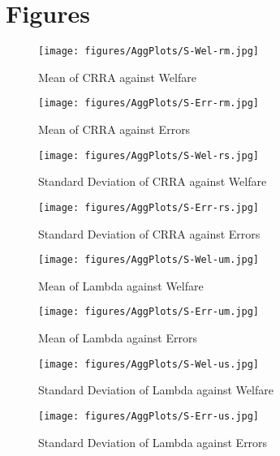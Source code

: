 \documentclass[../main.tex]{subfiles}
\begin{document}
\newpage

\section{Figures}

\begin{figure}[hp!]
	\center
	\caption{Mean of CRRA against Welfare}
	\texttt{[image: figures/AggPlots/S-Wel-rm.jpg]}
	\label{fig:S-Wel-rm}
\end{figure}

\begin{figure}[hp!]
	\center
	\caption{Mean of CRRA against Errors}
	\texttt{[image: figures/AggPlots/S-Err-rm.jpg]}
	\label{fig:S-Err-rm}
\end{figure}

\begin{figure}[hp!]
	\center
	\caption{Standard Deviation of CRRA against Welfare}
	\texttt{[image: figures/AggPlots/S-Wel-rs.jpg]}
	\label{fig:S-Wel-rs}
\end{figure}

\begin{figure}[hp!]
	\center
	\caption{Standard Deviation of CRRA against Errors}
	\texttt{[image: figures/AggPlots/S-Err-rs.jpg]}
	\label{fig:S-Err-rs}
\end{figure}

\begin{figure}[hp!]
	\center
	\caption{Mean of Lambda against Welfare}
	\texttt{[image: figures/AggPlots/S-Wel-um.jpg]}
	\label{fig:S-Wel-um}
\end{figure}

\begin{figure}[hp!]
	\center
	\caption{Mean of Lambda against Errors}
	\texttt{[image: figures/AggPlots/S-Err-um.jpg]}
	\label{fig:S-Err-um}
\end{figure}

\begin{figure}[hp!]
	\center
	\caption{Standard Deviation of Lambda against Welfare}
	\texttt{[image: figures/AggPlots/S-Wel-us.jpg]}
	\label{fig:S-Wel-us}
\end{figure}

\begin{figure}[hp!]
	\center
	\caption{Standard Deviation of Lambda against Errors}
	\texttt{[image: figures/AggPlots/S-Err-us.jpg]}
	\label{fig:S-Err-us}
\end{figure}
\end{document}
